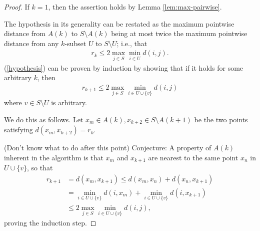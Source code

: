 \documentclass[a4paper,12pt]{article}
\theoremstyle{remark}
\begin{document}
\begin{proof}
    If $k = 1$, then the assertion holds by Lemma \ref{lem:max-pairwise}. \par %
    The hypothesis in its generality can be restated as the maximum pointwise distance from $A(k)$ to $S \setminus A(k)$ being at most twice the maximum pointwise distance from any $k$-subset $U$ to $S \setminus U$; i.e., that
    \begin{align} \label{hypothesis}
        r_k \leq 2\max_{j \in S}\min_{i \in U} d(i, j).
    \end{align}
    (\ref{hypothesis}) can be proven by induction by showing that if it holds for some arbitrary $k$, then
    \begin{align*}
        r_{k + 1} \leq 2\max_{j \in S}\min_{i \in U \cup \{ v \}} d(i, j)
    \end{align*}
    where $v \in S \setminus U$ is arbitrary.
    \iffalse
        $r_{U \cup \{ v \}}$ can be rewritten
        \begin{align*}
            r_{U \cup \{ v \}} = \min\{ r_U, \max_{w \in S \setminus U} d(v, w) \},
        \end{align*}
        and by definition $r_{k + 1} \leq r_k$, so the only part that remains to be shown is
        \begin{align*}
            r_{k + 1} \leq 2\max_{w \in S \setminus U} d(v, w).
        \end{align*}
    \fi
    We do this as follows. Let $x_m \in A(k), x_{k + 2} \in S \setminus A(k + 1)$ be the two points satisfying $d(x_m, x_{k + 2}) = r_k$. \par
    (Don't know what to do after this point) Conjecture: A property of $A(k)$ inherent in the algorithm is that $x_m$ and $x_{k + 1}$ are nearest to the same point $x_n$ in $U \cup \{ v \}$, so that
    \begin{align*}
        r_{k + 1} &= d(x_m, x_{k + 1}) \leq d(x_m, x_n) + d(x_n, x_{k + 1}) \\
        &= \min_{i \in U \cup \{ v \}} d(i, x_m) + \min_{i \in U \cup \{ v \}} d(i, x_{k + 1}) \\
        &\leq 2\max_{j \in S}\min_{i \in U \cup \{ v \}} d(i, j),
    \end{align*}
    proving the induction step.
\end{proof}
\end{document}
